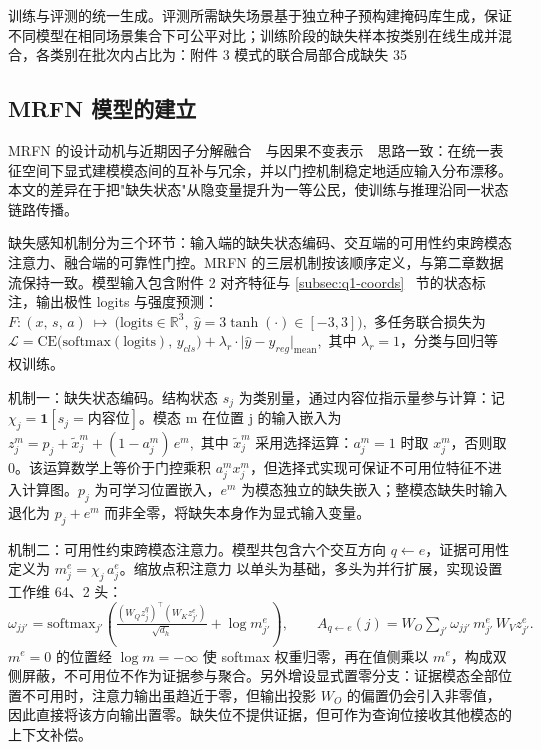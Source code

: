 \documentclass[colorprint,nocoverzero]{gmcmthesis}
\begin{document}
训练与评测的统一生成。评测所需缺失场景基于独立种子预构建掩码库生成，保证不同模型在相同场景集合下可公平对比；训练阶段的缺失样本按类别在线生成并混合，各类别在批次内占比为：附件 3 模式的联合局部合成缺失 35%

\subsection{MRFN 模型的建立}\label{subsec:q2-mrfn}
MRFN 的设计动机与近期因子分解融合~\cite{yang2026factorize}~与因果不变表示~\cite{mai2026invariant}~思路一致：在统一表征空间下显式建模模态间的互补与冗余，并以门控机制稳定地适应输入分布漂移。本文的差异在于把"缺失状态"从隐变量提升为一等公民，使训练与推理沿同一状态链路传播。

缺失感知机制分为三个环节：输入端的缺失状态编码、交互端的可用性约束跨模态注意力、融合端的可靠性门控。MRFN 的三层机制按该顺序定义，与第二章数据流保持一致。模型输入包含附件 2 对齐特征与 \ref{subsec:q1-coords}~ 节的状态标注，输出极性 logits 与强度预测：
\(F:(x,\,s,\,a)\ \mapsto\ \bigl(\mathrm{logits}\in\mathbb{R}^{3},\ \hat y=3\tanh(\cdot)\in[-3,3]\bigr),\)
多任务联合损失为
\(\mathcal{L}=\mathrm{CE}\bigl(\mathrm{softmax}(\mathrm{logits}),\,y_{cls}\bigr)+\lambda_r\cdot\bigl|\hat y-y_{reg}\bigr|_{\mathrm{mean}},\)
其中 \(\lambda_r=1\)，分类与回归等权训练。

机制一：缺失状态编码。结构状态 \(s_j\) 为类别量，通过内容位指示量参与计算：记 \(\chi_j=\mathbf{1}[s_j=\text{内容位}]\)。模态 m 在位置 j 的输入嵌入为
\(z_j^{m}=p_j+\tilde x_j^{m}+(1-a_j^{m})\,e^{m},\)
其中 \(\tilde x_j^{m}\) 采用选择运算：\(a_j^m=1\) 时取 \(x_j^m\)，否则取 0。该运算数学上等价于门控乘积 \(a_j^m x_j^m\)，但选择式实现可保证不可用位特征不进入计算图。\(p_j\) 为可学习位置嵌入，\(e^{m}\) 为模态独立的缺失嵌入；整模态缺失时输入退化为 \(p_j+e^{m}\) 而非全零，将缺失本身作为显式输入变量。

机制二：可用性约束跨模态注意力。模型共包含六个交互方向 \(q\leftarrow e\)，证据可用性定义为 \(m_j^{e}=\chi_j\,a_j^{e}\)。缩放点积注意力 \cite {vaswani2017attention} 以单头为基础，多头为并行扩展，实现设置工作维 64、2 头：
\(\omega_{jj'}=\mathrm{softmax}_{j'}\!\left(\frac{(W_Q z_j^{q})^{\top}(W_K z_{j'}^{e})}{\sqrt{d_h}}+\log m_{j'}^{e}\right),\qquad
A_{q\leftarrow e}(j)=W_O\sum_{j'}\omega_{jj'}\,m_{j'}^{e}\,W_V z_{j'}^{e}.\)
\(m^e=0\) 的位置经 \(\log m=-\infty\) 使 softmax 权重归零，再在值侧乘以 \(m^e\)，构成双侧屏蔽，不可用位不作为证据参与聚合。另外增设显式置零分支：证据模态全部位置不可用时，注意力输出虽趋近于零，但输出投影 \(W_O\) 的偏置仍会引入非零值，因此直接将该方向输出置零。缺失位不提供证据，但可作为查询位接收其他模态的上下文补偿。
\end{document}
